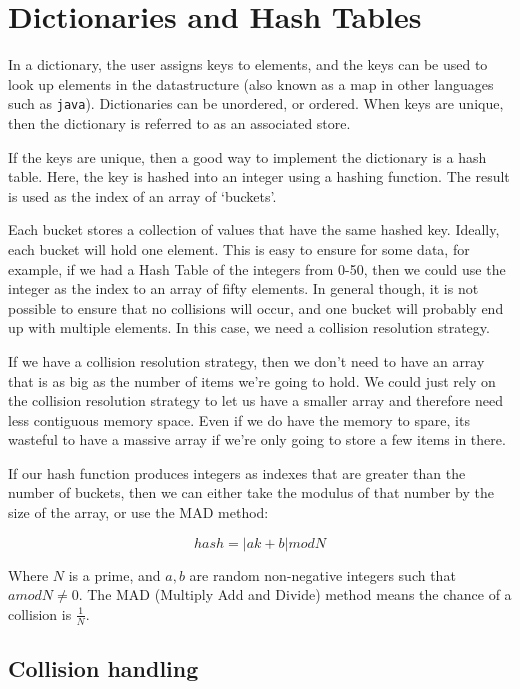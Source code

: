 \section{Dictionaries and Hash Tables}


In a dictionary, the user assigns keys to elements, and the keys can be used to
look up elements in the datastructure (also known as a map in other languages
such as \texttt{java}). Dictionaries can be unordered, or ordered. When keys are
unique, then the dictionary is referred to as an associated store.

If the keys are unique, then a good way to implement the dictionary is a hash
table. Here, the key is hashed into an integer using a hashing function. The
result is used as the index of an array of `buckets'.

Each bucket stores a collection of values that have the same hashed key.
Ideally, each bucket will hold one element. This is easy to ensure for some
data, for example, if we had a Hash Table of the integers from 0-50, then we
could use the integer as the index to an array of fifty elements. In general
though, it is not possible to ensure that no collisions will occur, and one
bucket will probably end up with multiple elements. In this case, we need a
collision resolution strategy.

If we have a collision resolution strategy, then we don't need to have an array
that is as big as the number of items we're going to hold. We could just rely on
the collision resolution strategy to let us have a smaller array and therefore
need less contiguous memory space. Even if we do have the memory to spare, its
wasteful to have a massive array if we're only going to store a few items in
there.

If our hash function produces integers as indexes that are greater than the
number of buckets, then we can either take the modulus of that number by the
size of the array, or use the MAD method:

\[
  hash = |ak + b| mod N
\]

Where $N$ is a prime, and $a,b$ are random non-negative integers such that $a
mod N \neq 0$. The MAD (Multiply Add and Divide) method means the chance of a
collision is $\frac{1}{N}$.

\subsection{Collision handling}

